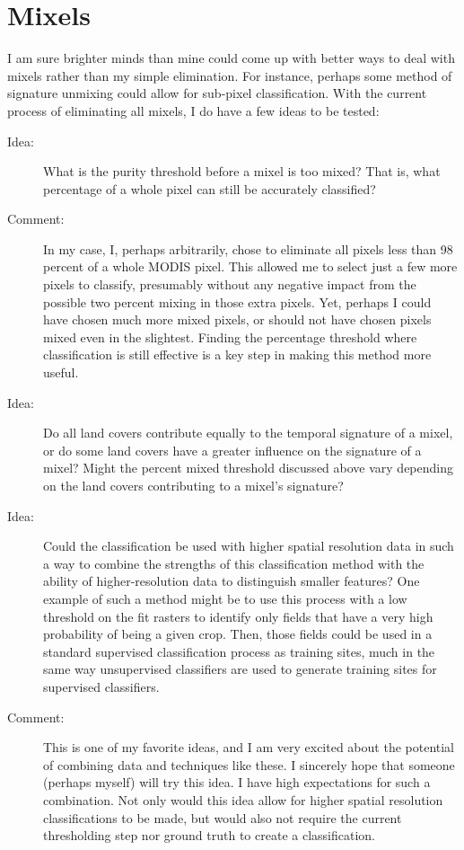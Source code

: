 \section{Mixels}

I am sure brighter minds than mine could come up with better ways to deal with mixels rather than my simple elimination. For instance, perhaps some method of signature unmixing could allow for sub-pixel classification. With the current process of eliminating all mixels, I do have a few ideas to be tested:

\begin{description}
\item[Idea:] What is the purity threshold before a mixel is too mixed? That is, what percentage of a whole pixel can still be accurately classified?

\item[Comment:] In my case, I, perhaps arbitrarily, chose to eliminate all pixels less than 98 percent of a whole MODIS pixel. This allowed me to select just a few more pixels to classify, presumably without any negative impact from the possible two percent mixing in those extra pixels. Yet, perhaps I could have chosen much more mixed pixels, or should not have chosen pixels mixed even in the slightest. Finding the percentage threshold where classification is still effective is a key step in making this method more useful.

\item[Idea:] Do all land covers contribute equally to the temporal signature of a mixel, or do some land covers have a greater influence on the signature of a mixel? Might the percent mixed threshold discussed above vary depending on the land covers contributing to a mixel’s signature?

\item[Idea:] Could the classification be used with higher spatial resolution data in such a way to combine the strengths of this classification method with the ability of higher-resolution data to distinguish smaller features? One example of such a method might be to use this process with a low threshold on the fit rasters to identify only fields that have a very high probability of being a given crop. Then, those fields could be used in a standard supervised classification process as training sites, much in the same way unsupervised classifiers are used to generate training sites for supervised classifiers.

\item[Comment:] This is one of my favorite ideas, and I am very excited about the potential of combining data and techniques like these. I sincerely hope that someone (perhaps myself) will try this idea. I have high expectations for such a combination. Not only would this idea allow for higher spatial resolution classifications to be made, but would also not require the current thresholding step nor ground truth to create a classification.
\end{description}


